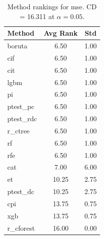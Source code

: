 \begin{table}[h]
\centering
\caption{Method rankings for mse. CD = 16.311 at $\alpha=0.05$.}
\label{tab:ranks_mse}
\begin{tabular}{lcc}
\toprule
Method & Avg Rank & Std \\
\midrule
boruta & 6.50 & 1.00 \\
cif & 6.50 & 1.00 \\
cit & 6.50 & 1.00 \\
lgbm & 6.50 & 1.00 \\
pi & 6.50 & 1.00 \\
ptest_pc & 6.50 & 1.00 \\
ptest_rdc & 6.50 & 1.00 \\
r_ctree & 6.50 & 1.00 \\
rf & 6.50 & 1.00 \\
rfe & 6.50 & 1.00 \\
cat & 7.00 & 6.00 \\
et & 10.25 & 2.75 \\
ptest_dc & 10.25 & 2.75 \\
cpi & 13.75 & 0.75 \\
xgb & 13.75 & 0.75 \\
r_cforest & 16.00 & 0.00 \\
\bottomrule
\end{tabular}
\end{table}